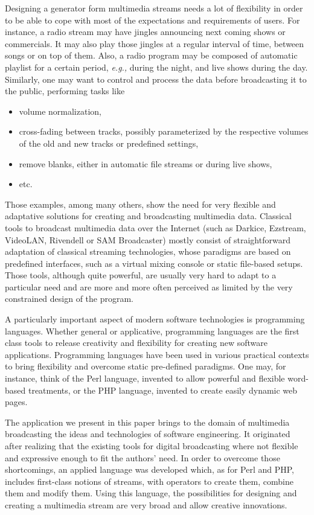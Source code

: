 \documentclass{llncs}
\newcommand{\eg}{{\em e.g.,}}
\begin{document}
Designing a generator form multimedia streams needs a lot of flexibility in
order to be able to cope with most of the expectations and requirements of
users. For instance, a radio stream may have jingles announcing next coming
shows or commercials. It may also play those jingles at a regular interval of
time, between songs or on top of them. Also, a radio program may be composed of
automatic playlist for a certain period, \eg{} during the night, and live shows
during the day. Similarly, one may want to control and process the data before
broadcasting it to the public, performing tasks like
\begin{itemize}
 \item volume normalization,
 \item cross-fading between tracks, possibly parameterized by the respective
   volumes of the old and new tracks or predefined settings,
 \item remove blanks, either in automatic file streams or during live shows,
 \item etc.
\end{itemize}

Those examples, among many others, show the need for very flexible and
adaptative solutions for creating and broadcasting multimedia data. Classical
tools to broadcast multimedia data over the Internet (such as Darkice, Ezstream,
VideoLAN, Rivendell or SAM Broadcaster) mostly consist of straightforward
adaptation of classical streaming technologies, whose paradigms are based on
predefined interfaces, such as a virtual mixing console or static file-based
setups. Those tools, although quite powerful, are usually very hard to adapt to
a particular need and are more and more often perceived as limited by the very
constrained design of the program.

A particularly important aspect of modern software technologies is programming
languages. Whether general or applicative, programming languages are the first 
class tools to release creativity and flexibility for creating new software applications.
Programming languages have been used in various practical contexts to bring flexibility
and overcome static pre-defined paradigms. One may, for instance, think of the Perl 
language, invented to allow powerful and flexible word-based treatments, or the PHP
language, invented to create easily dynamic web pages.

The application we present in this paper brings to the domain of multimedia
broadcasting the ideas and technologies of software engineering. It originated 
after realizing that the existing tools for digital broadcasting where not flexible
and expressive enough to fit the authors' need. In order to overcome those shortcomings,
an applied language was developed which, as for Perl and PHP, includes first-class
notions of streams, with operators to create them, combine them and modify them.
Using this language, the possibilities for designing and creating a multimedia stream
are very broad and allow creative innovations.
\end{document}
